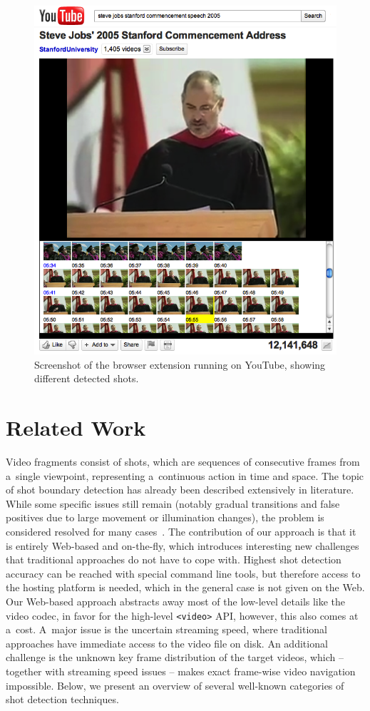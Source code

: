 \documentclass{sig-alternate}
\begin{document}
\begin{figure}
\begin{center}
   \includegraphics[width=0.8\linewidth]{./resources/stevejobs.png}
\end{center}
   \caption{Screenshot of the browser extension running on YouTube, showing different detected shots.}
\label{fig:screenshot}
\end{figure}

\section{Related Work} \label{sec:related-work}
Video fragments consist of shots, which are sequences of consecutive frames from a~single viewpoint, representing a~continuous action in time and space. The topic of shot boundary detection has already been described extensively in literature. While some specific issues still remain (notably gradual transitions and false positives due to large movement or illumination changes), the problem is considered resolved for many cases~\cite{Hanjalic2002, Yuan2007}.
The contribution of our approach is that it is entirely Web-based and on-the-fly, which introduces interesting new challenges that traditional approaches do not have to cope with.
Highest shot detection accuracy can be reached with special command line tools, but therefore access to the hosting platform is needed, which in the general case is not given on the Web.
Our Web-based approach abstracts away most of the low-level details like the video codec, in favor for the high-level \texttt{<video>} API, however, this also comes at a~cost.
A~major issue is the uncertain streaming speed, where traditional approaches have immediate access to the video file on disk.
An additional challenge is the unknown key frame distribution of the target videos, which -- together with streaming speed issues -- makes exact frame-wise video navigation impossible.
Below, we present an overview of several well-known categories of shot detection techniques.
\end{document}
